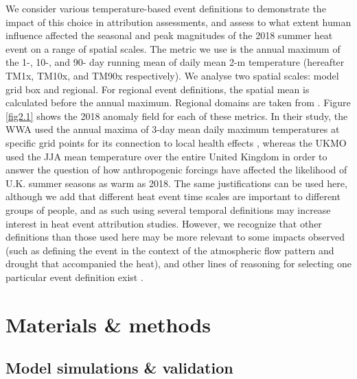   We consider various temperature-based event definitions to demonstrate the impact of this choice in attribution assessments, and assess to what extent human influence affected the seasonal and peak magnitudes of the 2018 summer heat event on a range of spatial scales. The metric we use is the annual maximum of the 1-, 10-, and 90- day running mean of daily mean 2-m temperature (hereafter TM1x, TM10x, and TM90x respectively). We analyse two spatial scales: model grid box and regional. For regional event definitions, the spatial mean is calculated before the annual maximum. Regional domains are taken from \citet{christensen_summary_2007}. Figure \ref{fig2.1} shows the 2018 anomaly field for each of these metrics. In their study, the WWA used the annual maxima of 3-day mean daily maximum temperatures at specific grid points for its connection to local health effects \citep{dippoliti_impact_2010}, whereas the UKMO used the JJA mean temperature over the entire United Kingdom in order to answer the question of how anthropogenic forcings have affected the likelihood of U.K. summer seasons as warm as 2018. The same justifications can be used here, although we add that different heat event time scales are important to different groups of people, and as such using several temporal definitions may increase interest in heat event attribution studies. However, we recognize that other definitions than those used here may be more relevant to some impacts observed (such as defining the event in the context of the atmospheric flow pattern and drought that accompanied the heat), and other lines of reasoning for selecting one particular event definition exist \citep{cattiaux_defining_2018}.

\section{Materials \& methods}\label{ch2:methods}

  \subsection*{Model simulations \& validation}

